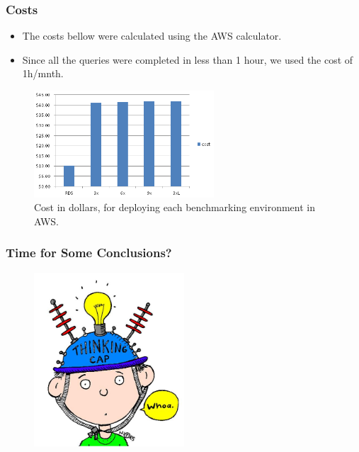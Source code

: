 \documentclass[hyperref={pdfpagelabels=true}]{beamer}
\begin{document}
\begin{frame}
\frametitle{Costs}
  \begin{itemize}    
    \item<1->The costs bellow were calculated using the AWS calculator.
    \item<1->Since all the queries were completed in less than 1 hour, we used the cost of 1h/mnth.
  \end{itemize} 
    \begin{figure}       
	\includegraphics[width=0.6\textwidth]{cost.png}      
	\caption{\tiny{Cost in dollars, for deploying each benchmarking environment in AWS.}}
     \end{figure} 
\end{frame}

\begin{frame}
\frametitle{Time for Some Conclusions?}
  \begin{figure}       
      \includegraphics[width=0.5\textwidth]{think.jpg}      
    \end{figure} 
\end{frame}
\end{document}
